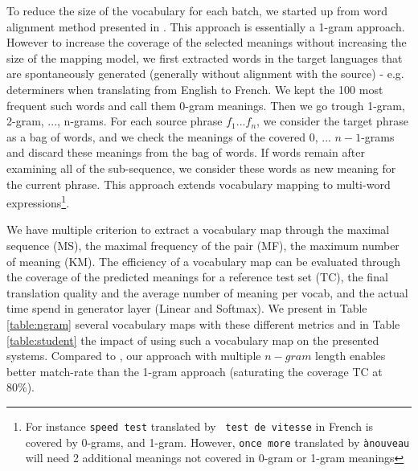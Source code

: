 \documentclass[11pt,a4paper]{article}
\begin{document}
To reduce the size of the vocabulary for each batch, we started up
from word alignment method presented in
. This approach is essentially a 1-gram
approach. However to increase the coverage of the selected meanings
without increasing the size of the mapping model, we first extracted
words in the target languages that are spontaneously generated
(generally without alignment with the source) - e.g. determiners when
translating from English to French. We kept the 100 most frequent such
words and call them 0-gram meanings. Then we go trough 1-gram, 2-gram,
..., n-grams. For each source phrase $f_1 ... f_n$, we consider the
target phrase as a bag of words, and we check the meanings of the
covered $0$, ... $n-1$-grams and discard these meanings from the bag
of words. If words remain after examining all of the sub-sequence, we
consider these words as new meaning for the current phrase. This
approach extends vocabulary mapping to multi-word
expressions\footnote{For instance {\tt speed test} translated by {\tt
    test de vitesse} in French is covered by 0-grams, and
  1-gram. However, {\tt once more} translated by {\tt ànouveau} will
  need 2 additional meanings not covered in 0-gram or 1-gram
  meanings}.

We have multiple criterion to extract a vocabulary map through the
maximal sequence (MS), the maximal frequency of the pair (MF), the
maximum number of meaning (KM). The efficiency of a vocabulary map can
be evaluated through the coverage of the predicted meanings for a
reference test set (TC), the final translation quality and the average
number of meaning per vocab, and the actual time spend in generator
layer (Linear and Softmax).  We present in Table \ref{table:ngram}
several vocabulary maps with these different metrics and in Table
\ref{table:student} the impact of using such a vocabulary map on the
presented systems. Compared to , our approach
with multiple $n-gram$ length enables better match-rate than the
1-gram approach (saturating the coverage TC at 80\%).
\end{document}
